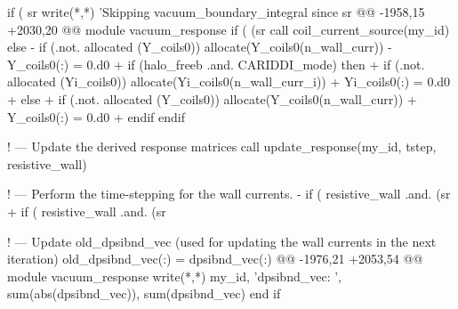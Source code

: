      if ( sr%
       write(*,*) 'Skipping vacuum_boundary_integral since sr%
@@ -1958,15 +2030,20 @@ module vacuum_response
     if ( (sr%
       call coil_current_source(my_id)
     else
-      if (.not. allocated (Y_coils0)) allocate(Y_coils0(n_wall_curr))
-      Y_coils0(:) = 0.d0
+      if (halo_freeb .and. CARIDDI_mode) then
+        if (.not. allocated (Yi_coils0)) allocate(Yi_coils0(n_wall_curr_i))
+        Yi_coils0(:) = 0.d0
+      else
+        if (.not. allocated (Y_coils0)) allocate(Y_coils0(n_wall_curr))
+        Y_coils0(:) = 0.d0
+      endif
     endif
 
     ! --- Update the derived response matrices
     call update_response(my_id, tstep, resistive_wall)
 
     ! --- Perform the time-stepping for the wall currents.
-    if ( resistive_wall .and.  (sr%
+    if ( resistive_wall .and.  (sr%
 
     ! --- Update old_dpsibnd_vec  (used for updating the wall currents in the next iteration)
     old_dpsibnd_vec(:) = dpsibnd_vec(:)
@@ -1976,21 +2053,54 @@ module vacuum_response
       write(*,*) my_id, 'dpsibnd_vec: ', sum(abs(dpsibnd_vec)), sum(dpsibnd_vec)
     end if
 
